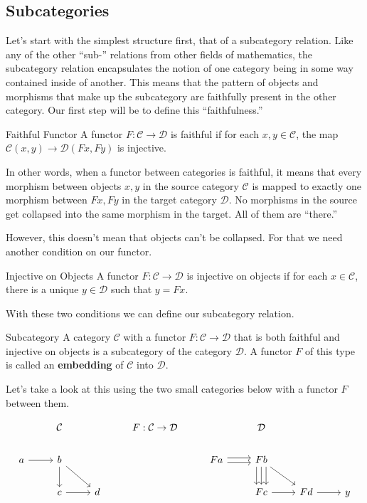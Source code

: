 \documentclass[12pt]{article}
\begin{document}
\subsection*{Subcategories}
Let's start with the simplest structure first, that of a subcategory relation.
Like any of the other ``sub-'' relations from other fields of mathematics, the subcategory relation encapsulates the notion of one category being in some way contained inside of another.
This means that the pattern of objects and morphisms that make up the subcategory are faithfully present in the other category.
Our first step will be to define this ``faithfulness.''

\begin{definition}{Faithful Functor}{}
    A functor $F:\mathcal{C}\rightarrow\mathcal{D}$ is faithful if for each $x,y\in\mathcal{C}$, the map $\mathcal{C}(x, y)\rightarrow\mathcal{D}(Fx,Fy)$ is injective.
\end{definition}
In other words, when a functor between categories is faithful, it means that every morphism between objects $x,y$ in the source category $\mathcal{C}$ is mapped to exactly one morphism between $Fx, Fy$ in the target category $\mathcal{D}$.
No morphisms in the source get collapsed into the same morphism in the target.
All of them are ``there.''

However, this doesn't mean that objects can't be collapsed.
For that we need another condition on our functor.

\begin{definition}{Injective on Objects}{}
    A functor $F:\mathcal{C}\rightarrow\mathcal{D}$ is injective on objects if for each $x\in\mathcal{C}$, there is a unique $y\in\mathcal{D}$ such that $y=Fx$.
\end{definition}

With these two conditions we can define our subcategory relation.

\begin{definition}{Subcategory}{}
    A category $\mathcal{C}$ with a functor $F:\mathcal{C}\rightarrow\mathcal{D}$ that is both faithful and injective on objects is a subcategory of the category $\mathcal{D}$.
    A functor $F$ of this type is called an \textbf{embedding} of $\mathcal{C}$ into $\mathcal{D}$.
\end{definition}

Let's take a look at this using the two small categories below with a functor $F$ between them.

\[\begin{tikzcd}
        & {\mathcal{C}} && {F:\mathcal{C}\rightarrow\mathcal{D}} && {\mathcal{D}} \\
        a & b &&& Fa & Fb \\
        & c & d &&& Fc & Fd & y
        \arrow[from=2-1, to=2-2]
        \arrow[from=2-2, to=3-2]
        \arrow[from=3-2, to=3-3]
        \arrow[from=2-2, to=3-3]
        \arrow[shift left, from=2-5, to=2-6]
        \arrow[shift left=2, from=2-6, to=3-6]
        \arrow[from=2-6, to=3-7]
        \arrow[from=3-6, to=3-7]
        \arrow[shift right, from=2-5, to=2-6]
        \arrow[shift right=2, from=2-6, to=3-6]
        \arrow[from=2-6, to=3-6]
        \arrow[from=3-7, to=3-8]
    \end{tikzcd}\]
\end{document}
